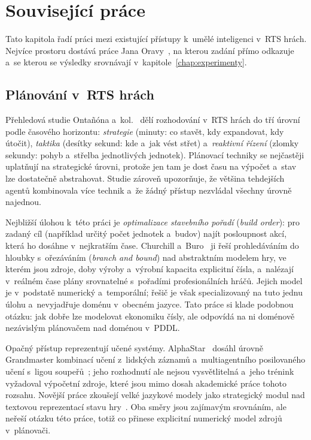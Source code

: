 \chapter{Související práce}
\label{chap:souvisejici}

Tato kapitola řadí práci mezi existující přístupy k~umělé inteligenci v~RTS hrách. Nejvíce prostoru dostává práce Jana Oravy~\cite{Orava2025}, na kterou zadání přímo odkazuje a~se kterou se výsledky srovnávají v~kapitole~\ref{chap:experimenty}.

\section{Plánování v~RTS hrách}
\label{sec:rts}

Přehledová studie Ontañóna a~kol.~\cite{Ontanon2013} dělí rozhodování v~RTS hrách do tří úrovní podle časového horizontu: \emph{strategie} (minuty: co stavět, kdy expandovat, kdy útočit), \emph{taktika} (desítky sekund: kde a~jak vést střet) a~\emph{reaktivní řízení} (zlomky sekundy: pohyb a~střelba jednotlivých jednotek). Plánovací techniky se nejčastěji uplatňují na strategické úrovni, protože jen tam je dost času na výpočet a~stav lze dostatečně abstrahovat. Studie zároveň upozorňuje, že většina tehdejších agentů kombinovala více technik a~že žádný přístup nezvládal všechny úrovně najednou.

Nejbližší úlohou k~této práci je \emph{optimalizace stavebního pořadí} (\emph{build order}): pro zadaný cíl (například určitý počet jednotek a~budov) najít posloupnost akcí, která ho dosáhne v~nejkratším čase. Churchill a~Buro~\cite{ChurchillBuro2011} ji řeší prohledáváním do hloubky s~ořezáváním (\emph{branch and bound}) nad abstraktním modelem hry, ve kterém jsou zdroje, doby výroby a~výrobní kapacita explicitní čísla, a~nalézají v~reálném čase plány srovnatelné s~pořadími profesionálních hráčů. Jejich model je v~podstatě numerický a~temporální; řešič je však specializovaný na tuto jednu úlohu a~nevyjadřuje doménu v~obecném jazyce. Tato práce si klade podobnou otázku: jak dobře lze modelovat ekonomiku čísly, ale odpovídá na ni doménově nezávislým plánovačem nad doménou v~PDDL.

Opačný přístup reprezentují učené systémy. AlphaStar~\cite{VinyalsEtAl2019} dosáhl úrovně Grandmaster kombinací učení z~lidských záznamů a~multiagentního posilovaného učení s~ligou soupeřů~\cite{AlphaStar2019b}; jeho rozhodnutí ale nejsou vysvětlitelná a~jeho trénink vyžadoval výpočetní zdroje, které jsou mimo dosah akademické práce tohoto rozsahu. Novější práce zkoušejí velké jazykové modely jako strategický modul nad textovou reprezentací stavu hry~\cite{MaEtAl2024,MaEtAl2025}. Oba směry jsou zajímavým srovnáním, ale neřeší otázku této práce, totiž co přinese explicitní numerický model zdrojů v~plánovači.

